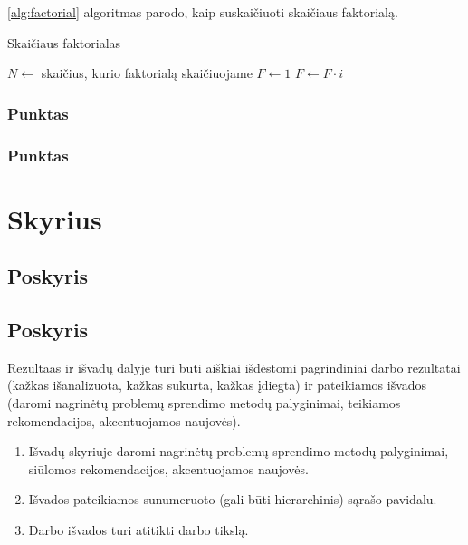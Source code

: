 \documentclass[
    english, %
]{VUMIFPSkursinis}
\begin{document}
\ref{alg:factorial} algoritmas parodo, kaip suskaičiuoti skaičiaus faktorialą.

\begin{algorithm}
    \caption{Skaičiaus faktorialas}
    \begin{algorithmic}[1] %
        \State $N\gets$ skaičius, kurio faktorialą skaičiuojame
        \State $F\gets 1$
        \State $F\gets F \cdot i$
        \EndFor
    \end{algorithmic}
    \label{alg:factorial}
\end{algorithm}

\subsubsection{Punktas}
\subsubsection{Punktas}
\section{Skyrius}
\subsection{Poskyris}
\subsection{Poskyris}

Rezultaas ir išvadų dalyje turi būti aiškiai išdėstomi pagrindiniai darbo
rezultatai (kažkas išanalizuota, kažkas sukurta, kažkas įdiegta) ir pateikiamos
išvados (daromi nagrinėtų problemų sprendimo metodų palyginimai, teikiamos
rekomendacijos, akcentuojamos naujovės).

\begin{enumerate}[labelindent=0pt]
    \item Išvadų skyriuje daromi nagrinėtų problemų sprendimo metodų palyginimai, siūlomos
          rekomendacijos, akcentuojamos naujovės.
    \item Išvados pateikiamos sunumeruoto (gali būti hierarchinis) sąrašo pavidalu.
    \item Darbo išvados turi atitikti darbo tikslą.
\end{enumerate}
\end{document}
